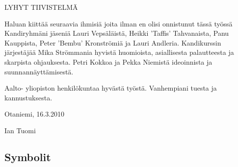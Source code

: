 \documentclass[finnish,12pt]{article}
\begin{document}

	\author{Ian Tuomi}
	\date{5.12.2012}
	\makecoverpage

	\begin{abstractpage}[finnish]
  
LYHYT TIIVISTELMÄ
  
	\end{abstractpage}

	\newpage


Haluan kiittää seuraavia ihmisiä joita ilman en olisi onnistunut tässä työssä
Kandiryhmäni jäseniä Lauri Vepsäläistä, Heikki 'Taffis' Tahvanaista, Panu Kauppista, Peter 'Bembu'  Kronströmiä ja Lauri Andleria.
Kandikurssin järjestäjää 
Mika Strömmania hyvistä huomioista,  asiallisesta palautteesta ja skarpista ohjauksesta.
Petri Kokkoa ja Pekka Niemistä ideoinnista ja suunnannäyttämisestä.

Aalto- yliopiston henkilökuntaa hyvästä työstä.
Vanhempiani tuesta ja kannustuksesta.
\\

	\vspace{5cm}

Otaniemi, 16.3.2010

	\vspace{5mm}
	{\hfill Ian Tuomi \hspace{1cm}}

	\newpage

	\tableofcontents


	\subsection*{Symbolit}
\end{document}
